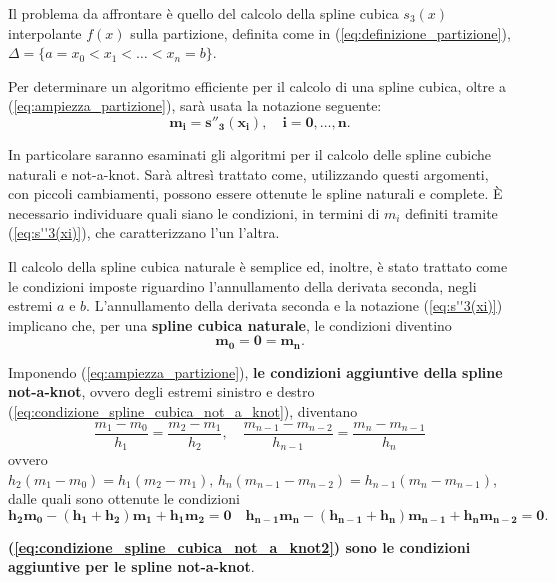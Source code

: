 Il problema da affrontare è quello del calcolo della spline cubica $s_3(x)$ interpolante $f(x)$ sulla partizione, definita come in (\ref{eq:definizione_partizione}), $\Delta=\{a=x_0<x_1<\hdots<x_n=b\}$.

Per determinare un algoritmo efficiente per il calcolo di una spline cubica, oltre a (\ref{eq:ampiezza_partizione}), sarà usata la notazione seguente:
\begin{equation}\label{eq:s''3(xi)}
    \boldsymbol{m_i=s''_3(x_i),\quad i=0,\hdots,n.}
\end{equation}

In particolare saranno esaminati gli algoritmi per il calcolo delle spline cubiche naturali e not-a-knot. Sarà altresì trattato come, utilizzando questi argomenti, con piccoli cambiamenti, possono essere ottenute le spline naturali e complete. È necessario individuare quali siano le condizioni, in termini di $m_i$ definiti tramite (\ref{eq:s''3(xi)}), che caratterizzano l'un l'altra.

Il calcolo della spline cubica naturale è semplice ed, inoltre, è stato trattato come le condizioni imposte riguardino l'annullamento della derivata seconda, negli estremi $a$ e $b$. L'annullamento della derivata seconda e la notazione (\ref{eq:s''3(xi)}) implicano che, per una \textbf{spline cubica naturale}, le condizioni diventino
\begin{equation}\label{eq:condizione_spline_naturale}
    \boldsymbol{m_0=0=m_n}.
\end{equation}

Imponendo (\ref{eq:ampiezza_partizione}), \textbf{le condizioni aggiuntive della spline not-a-knot}, ovvero degli estremi sinistro e destro (\ref{eq:condizione_spline_cubica_not_a_knot}), diventano
\begin{equation*}
    \frac{m_1-m_0}{h_1}=\frac{m_2-m_1}{h_2},\quad \frac{m_{n-1}-m_{n-2}}{h_{n-1}}=\frac{m_n-m_{n-1}}{h_n}
\end{equation*}
ovvero $h_2(m_1-m_0)=h_1(m_2-m_1),\, h_{n}(m_{n-1}-m_{n-2})=h_{n-1}(m_{n}-m_{n-1})$, dalle quali sono ottenute le condizioni
\begin{equation}\label{eq:condizione_spline_cubica_not_a_knot2}
    \boldsymbol{h_2m_0-(h_1+h_2)m_1+h_1m_2=0}\quad\boldsymbol{h_{n-1}m_n-(h_{n-1}+h_n)m_{n-1}+h_nm_{n-2}=0}.
\end{equation}

\textbf{(\ref{eq:condizione_spline_cubica_not_a_knot2}) sono le condizioni aggiuntive per le spline not-a-knot}.

